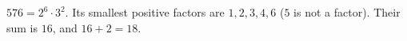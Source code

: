 $576=2^6\cdot3^2$. Its smallest positive factors are $1,2,3,4,6$ ($5$ is not a factor). Their sum is $16$, and $16+2=\boxed{18}$.
